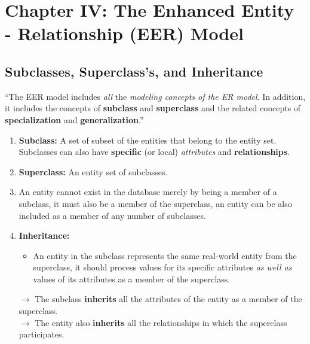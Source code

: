 \documentclass[10pt]{article}
\newcommand{\quotes}[1]{``#1''}
\begin{document}
\section*{Chapter IV: The Enhanced Entity - Relationship (EER) Model}

\subsection{Subclasses, Superclass's, and Inheritance}

\quotes{The EER model includes \textit{all} the \textit{modeling concepts of the ER model}. In addition, it includes the concepts of \textbf{subclass} and \textbf{superclass} and the related concepts of \textbf{specialization} and \textbf{generalization}.}

\begin{enumerate}
	\item \textbf{Subclass:} A set of subset of the entities that belong to the entity set. Subclasses can also have \textbf{specific} (or local) \textit{attributes} and \textbf{relationships}.
	\item \textbf{Superclass:} An entity set of subclasses.
	\item An entity cannot exist in the database merely by being a member of a subclass, it must also be a member of the superclass, an entity can be also included as a member of any number of subclasses.
	\item \textbf{Inheritance: }
	\begin{itemize}
		\item An entity in the subclass represents the same real-world entity from the superclass, it should process values for its specific attributes \textit{as well as} values of its attributes as a member of the superclass.
	\end{itemize}
	$\rightarrow$ The subclass \textbf{inherits} all the attributes of the entity as a member of the superclass. \\
	$\rightarrow$ The entity also \textbf{inherits} all the relationships in which the superclass participates.
\end{enumerate}
\end{document}
